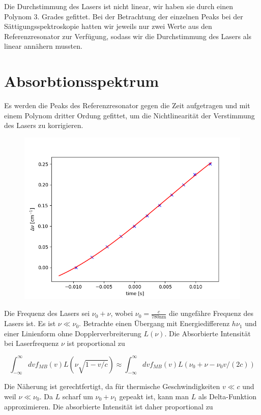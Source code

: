\documentclass[a4paper,parskip]{scrartcl}
\begin{document}
Die Durchstimmung des Lasers ist nicht linear, wir haben sie durch einen Polynom 3. Grades gefittet. Bei der Betrachtung der einzelnen Peaks bei der Sättigungsspektroskopie hatten wir jeweils nur zwei Werte aus den Referenzresonator zur Verfügung, sodass wir die Durchstimmung des Lasers als linear annähern mussten.

\section{Absorbtionsspektrum}

Es werden die Peaks des Referenzresonator gegen die Zeit aufgetragen und mit einem Polynom dritter Ordung gefittet, um die Nichtlinearität der Verstimmung des Lasers zu korrigieren.

\begin{figure}[h]
\includegraphics[scale = 0.5]{./absorbtion/frequencyCorrection}
\end{figure}

Die Frequenz des Lasers sei $\nu_0+\nu$, wobei $\nu_0=\frac{c}{780\mathrm{nm}}$ die ungefähre Frequenz des Lasers ist. Es ist $\nu \ll \nu_0$.
Betrachte einen Übergang mit Energiedifferenz $h\nu_1$ und einer Linienform ohne Dopplerverbreiterung $L(\nu)$.  Die Absorbierte Intensität bei Laserfrequenz $\nu$ ist proportional zu

$$\int_{-\infty}^{\infty} dv f_{MB}(v)L(\nu\sqrt{1-v/c}) \approx \int_{-\infty}^{\infty} dv f_{MB}(v)L(\nu_0+\nu-\nu_0 v/(2c))$$

Die Näherung ist gerechtfertigt, da für thermische Geschwindigkeiten $v \ll c$ und weil $\nu \ll \nu_0$. Da $L$ scharf um $\nu_0 + \nu_1$ gepeakt ist, kann man $L$ als Delta-Funktion approximieren. Die absorbierte Intensität ist daher proportional zu
\end{document}
